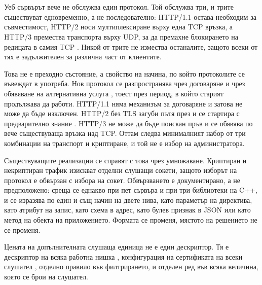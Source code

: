 %

\section*{}

\subsection*{}

Уеб сървърът вече не обслужва един протокол. Той обслужва три, и трите съществуват
едновременно, а не последователно: HTTP/1.1 остава необходим за съвместимост, HTTP/2 носи
мултиплексиране върху една TCP връзка, а HTTP/3 премества транспорта върху UDP, за да
премахне блокирането на редицата в самия TCP \cite{rfc9114}. Никой от трите не измества
останалите, защото всеки от тях е задължителен за различна част от клиентите.

Това не е преходно състояние, а свойство на начина, по който протоколите се въвеждат в
употреба. Нов протокол се разпространява чрез договаряне и чрез обявяване на алтернативна
услуга \cite{rfc7838}, тоест през период, в който старият продължава да работи. HTTP/1.1
няма механизъм за договаряне и затова не може да бъде изключен. HTTP/2 без TLS загуби пътя
през  и се стартира с предварително знание \cite{rfc9113}. HTTP/3 не може да
бъде поискан пръв и се обявява по вече съществуваща връзка над TCP. Оттам следва минималният
набор от три комбинации на транспорт и криптиране, и той не е избор на администратора.

Съществуващите реализации се справят с това чрез умножаване. Криптиран и некриптиран трафик
изискват отделни слушащи сокети, защото изборът на протокол е обвързан с избора на сокет.
Обвързването е документирано, а не предположено: среща се еднакво при пет сървъра и при три
библиотеки на C++, и се изразява по един и същ начин на двете нива, като параметър на
директива, като атрибут на запис, като схема в адрес, като булев признак в JSON или като
метод на обекта на приложението. Формата се променя, мястото на решението не се променя.

Цената на допълнителната слушаща единица не е един дескриптор. Тя е дескриптор на всяка
работна нишка \cite{nginxlisten}, конфигурация на сертификата на всеки слушател
\cite{h2olisten, drogonconfig}, отделно правило във филтрирането, и отделен ред във всяка
величина, която се брои на слушател.

